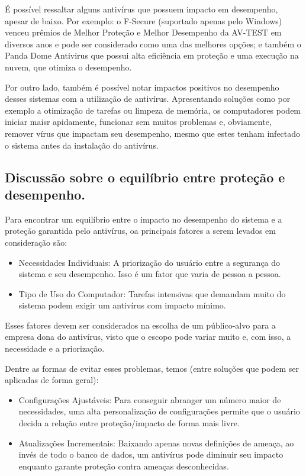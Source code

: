 \documentclass[10pt,conference,twocolumn]{article}
\begin{document}
É possível ressaltar alguns antivírus que possuem impacto em desempenho, apesar de baixo. Por exemplo: o F-Secure (suportado apenas pelo Windows) venceu prêmios de Melhor Proteção e Melhor Desempenho da AV-TEST em diversos anos e pode ser considerado como uma das melhores opções; e também o Panda Dome Antivirus que possui alta eficiência em proteção e uma execução na nuvem, que otimiza o desempenho.

Por outro lado, também é possível notar impactos positivos no desempenho desses sistemas com a utilização de antivírus. Apresentando soluções como por exemplo a otimização de tarefas ou limpeza de memória, os computadores podem iniciar maisr apidamente, funcionar sem muitos problemas e, obviamente, remover vírus que impactam seu desempenho, mesmo que estes tenham infectado o sistema antes da instalação do antivírus.

\subsection*{Discussão sobre o equilíbrio entre proteção e desempenho.}
Para encontrar um equilíbrio entre o impacto no desempenho do sistema e a proteção garantida pelo antivírus, oa principais fatores a serem levados em consideração são:
\begin{itemize}
\item
Necessidades Individuais:
A priorização do usuário entre a segurança do sistema e seu desempenho. Isso é um fator que varia de pessoa a pessoa.
\item
Tipo de Uso do Computador: 
Tarefas intensivas que demandam muito do sistema podem exigir um antivírus com impacto mínimo.
\end{itemize}

Esses fatores devem ser considerados na escolha de um público-alvo para a empresa dona do antivírus, visto que o escopo pode variar muito e, com isso, a necessidade e a priorização.\newline

Dentre as formas de evitar esses problemas, temos (entre soluções que podem ser aplicadas de forma geral):
\begin{itemize}
\item
Configurações Ajustáveis: 
Para conseguir abranger um número maior de necessidades, uma alta personalização de configurações permite que o usuário decida a relação entre proteção/impacto de forma mais livre.
\item
Atualizações Incrementais: 
Baixando apenas novas definições de ameaça, ao invés de todo o banco de dados, um antivírus pode diminuir seu impacto enquanto garante proteção contra ameaças desconhecidas.
\end{itemize}
\end{document}
